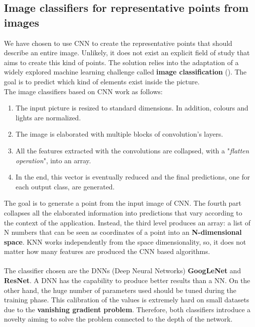 \subsection{Image classifiers for representative points from images} \label{sec:classifiers}
We have chosen to use CNN to create the representative points that should describe an entire image. Unlikely, it does not exist an explicit field of study that aims to create this kind of points. The solution relies into the adaptation of a widely explored machine learning challenge called \textbf{image classification} (). The goal is to predict which kind of elements exist inside the picture.\\
The image classifiers based on CNN work as follows:
\begin{enumerate}
	\item The input picture is resized to standard dimensions. In addition, colours and lights are normalized.
	\item The image is elaborated with multiple blocks of convolution's layers.
	\item All the features extracted with the convolutions are collapsed, with a "\textit{flatten operation}", into an array.
	\item In the end, this vector is eventually reduced and the final predictions, one for each output class, are generated.
\end{enumerate}
The goal is to generate a point from the input image of CNN. The fourth part collapses all the elaborated information into predictions that vary according to the context of the application. Instead, the third level produces an array: a list of N numbers that can be seen as coordinates of a point into an \textbf{N-dimensional space}. KNN works independently from the space dimensionality, so, it does not matter how many features are produced the CNN based algorithms.\\
\\
The classifier chosen are the DNNs (Deep Neural Networks) \textbf{GoogLeNet} and \textbf{ResNet}\cite{resNet_model}. A DNN has the capability to produce better results than a NN. On the other hand, the huge number of parameters used should be tuned during the training phase. This calibration of the values is extremely hard on small datasets due to the \textbf{vanishing gradient problem}. Therefore, both classifiers introduce a novelty aiming to solve the problem connected to the depth of the network.

